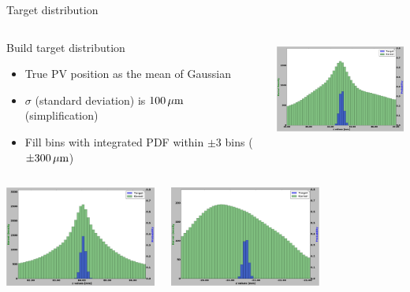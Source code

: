 \begin{frame}{Target distribution}
\vspace{-.8cm}
\begin{columns}[c]
    \begin{block}{Build target distribution}
      \begin{itemize}
          \item True PV position as the mean of Gaussian
          \item $\sigma$ (standard deviation) is $\unit[100]{\mu m}$ (simplification)
          \item Fill bins with integrated PDF within $\pm 3$ bins ($\pm \unit[300]{\mu m}$)
      \end{itemize}
    \end{block}
      \begin{center}
    \includegraphics[height=3.3cm, trim=18 0 18 0]{images/T_1_25.png}
  \end{center}
  \end{columns}
  \vspace{-.5cm}
  \begin{columns}
      \begin{center}
        \includegraphics[height=3.3cm,trim=18 0 18 0]{images/T_2_25.png}
      \end{center}
      \begin{center}
        \includegraphics[height=3.3cm,trim=18 0 18 0]{images/T_3_25.png}

\end{center}
\end{columns}
\end{frame}
